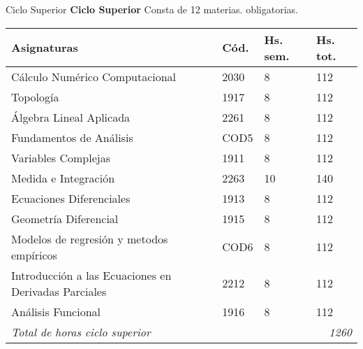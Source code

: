 \documentclass[11pt]{beamer}
\begin{document}
\begin{frame}{Ciclo Superior}
 \fontsize{11pt}{11pt}\selectfont
\textbf{Ciclo Superior} Consta de 12 materias.
obligatorias.

\begin{center}
\begin{tabularx}{1\textwidth}{|p{5.5cm}|p{1.3cm}|p{1.3cm}|p{1.3cm}|}
\hline
  \rowcolor[gray]{.9}
Asignaturas   & Cód. & Hs. sem.&  Hs. tot.\\ \hline

Cálculo Numérico  Computacional          & 2030   &           8        &     112           \\ \hline
Topología                                & 1917   &           8        &     112           \\ \hline
Álgebra Lineal Aplicada                  & 2261   &           8        &     112           \\ \hline
Fundamentos de Análisis           &   COD5 &             8        &             112    \\ \hline
Variables Complejas   & 1911   &           8        &     112           \\ \hline
Medida e Integración                     & 2263   &           10        &     140           \\ \hline
Ecuaciones Diferenciales                 & 1913   &           8        &     112           \\ \hline
Geometría Diferencial                    & 1915   &           8        &     112           \\ \hline
Modelos de regresión y metodos empíricos  & COD6  &           8
& 112  \\ \hline
Introducción a las Ecuaciones en Derivadas Parciales &   2212  & 8 & 112  \\ \hline
Análisis Funcional               &    1916   &       8        &            112      \\ \hline
\emph{Total de horas ciclo superior }    &\multicolumn{3}{r|}{\emph {1260}   }               \\ \hline

\end{tabularx}
\end{center}
\end{frame}
\end{document}
